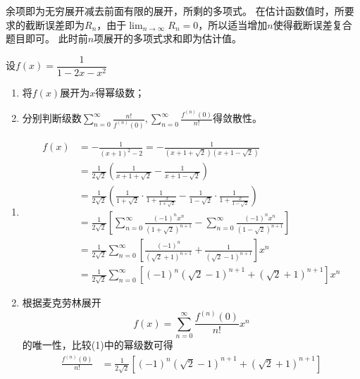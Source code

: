 余项即为无穷展开减去前面有限的展开，所剩的多项式。
在估计函数值时，所要求的截断误差即为$R_n$，由于$\lim_{n\to\infty}R_n=0$，所以适当增加$n$使得截断误差复合题目即可。
此时前$n$项展开的多项式求和即为估计值。

\begin{example}
    设$f(x)=\dfrac{1}{1-2x-x^2}$
    \begin{enumerate}[(1)]
        \item 将$f(x)$展开为$x$得幂级数；
        \item 分别判断级数$\displaystyle\sum_{n=0}^\infty \frac{n!}{f^{(n)}(0)},\sum_{n=0}^\infty \frac{f^{(n)}(0)}{n!}$得敛散性。
    \end{enumerate}
\end{example}
\begin{solution}
    \begin{enumerate}[(1)]
        \item \begin{align*}
                  f(x) & = -\frac{1}{(x+1)^2-2} = -\frac{1}{(x+1+\sqrt{2})(x+1-\sqrt{2})}                                                                                         \\
                       & = \frac{1}{2\sqrt{2}}\left(\frac{1}{x+1+\sqrt{2}} - \frac{1}{x+1-\sqrt{2}}\right)                                                                        \\
                       & = \frac{1}{2\sqrt{2}}\left(\frac{1}{1+\sqrt{2}}\cdot\frac{1}{1 + \frac{x}{1+\sqrt{2}}}- \frac{1}{1-\sqrt{2}}\cdot\frac{1}{1+\frac{x}{1-\sqrt{2}}}\right) \\
                       & = \frac{1}{2\sqrt{2}}\left[\sum_{n=0}^\infty \frac{(-1)^nx^n}{(1+\sqrt{2})^{n+1}} - \sum_{n=0}^\infty \frac{(-1)^nx^n}{(1-\sqrt{2})^{n+1}}\right]        \\
                       & = \frac{1}{2\sqrt{2}}\sum_{n=0}^\infty\left[\frac{(-1)^n}{(\sqrt{2}+1)^{n+1}} + \frac{1}{(\sqrt{2}-1)^{n+1}}\right]x^n                                   \\
                       & = \frac{1}{2\sqrt{2}}\sum_{n=0}^\infty\left[(-1)^n(\sqrt{2}-1)^{n+1} + (\sqrt{2}+1)^{n+1}\right]x^n
              \end{align*}
        \item 根据麦克劳林展开
              \[ f(x) = \sum_{n=0}^\infty \frac{f^{(n)}(0)}{n!}x^n \]
              的唯一性，比较(1)中的幂级数可得
              \begin{align*}
                  \frac{f^{(n)}(0)}{n!}
                   & = \frac{1}{2\sqrt{2}}\left[(-1)^n(\sqrt{2}-1)^{n+1} + (\sqrt{2}+1)^{n+1}\right]                              \\

\end{align*}
\end{enumerate}
\end{solution}
